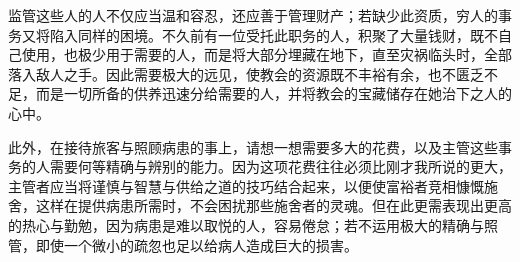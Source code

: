 监管这些人的人不仅应当温和容忍，还应善于管理财产；若缺少此资质，穷人的事务又将陷入同样的困境。不久前有一位受托此职务的人，积聚了大量钱财，既不自己使用，也极少用于需要的人，而是将大部分埋藏在地下，直至灾祸临头时，全部落入敌人之手。因此需要极大的远见，使教会的资源既不丰裕有余，也不匮乏不足，而是一切所备的供养迅速分给需要的人，并将教会的宝藏储存在她治下之人的心中。\par

此外，在接待旅客与照顾病患的事上，请想一想需要多大的花费，以及主管这些事务的人需要何等精确与辨别的能力。因为这项花费往往必须比刚才我所说的更大，主管者应当将谨慎与智慧与供给之道的技巧结合起来，以便使富裕者竞相慷慨施舍，这样在提供病患所需时，不会困扰那些施舍者的灵魂。但在此更需表现出更高的热心与勤勉，因为病患是难以取悦的人，容易倦怠；若不运用极大的精确与照管，即使一个微小的疏忽也足以给病人造成巨大的损害。\par

